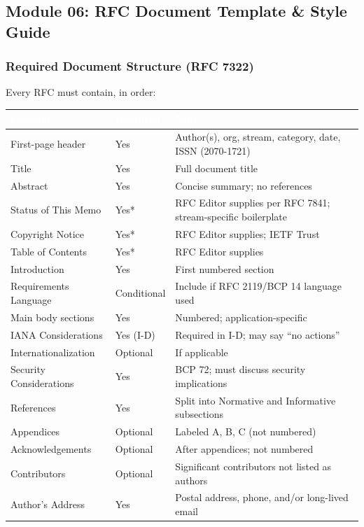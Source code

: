 \documentclass[11pt,letterpaper]{article}
\newcommand{\tableheader}[1]{\textbf{\sffamily\textcolor{white}{#1}}}
\begin{document}
\subsection{Module 06: RFC Document Template \& Style Guide}

\subsubsection{Required Document Structure (RFC 7322)}

Every RFC must contain, in order:

\begin{center}
\begin{tabularx}{\textwidth}{L{4cm}L{2cm}X}
\toprule
{}
\tableheader{Element} & \tableheader{Required} & \tableheader{Notes} \\
\midrule
First-page header & Yes & Author(s), org, stream, category, date, ISSN (2070-1721) \\
Title & Yes & Full document title \\
Abstract & Yes & Concise summary; no references \\
Status of This Memo & Yes* & RFC Editor supplies per RFC 7841; stream-specific boilerplate \\
Copyright Notice & Yes* & RFC Editor supplies; IETF Trust \\
Table of Contents & Yes* & RFC Editor supplies \\
Introduction & Yes & First numbered section \\
Requirements Language & Conditional & Include if RFC 2119/BCP 14 language used \\
Main body sections & Yes & Numbered; application-specific \\
IANA Considerations & Yes (I-D) & Required in I-D; may say ``no actions'' \\
Internationalization & Optional & If applicable \\
Security Considerations & Yes & BCP 72; must discuss security implications \\
References & Yes & Split into Normative and Informative subsections \\
Appendices & Optional & Labeled A, B, C (not numbered) \\
Acknowledgements & Optional & After appendices; not numbered \\
Contributors & Optional & Significant contributors not listed as authors \\
Author's Address & Yes & Postal address, phone, and/or long-lived email \\
\bottomrule
\end{tabularx}
\end{center}
\end{document}
